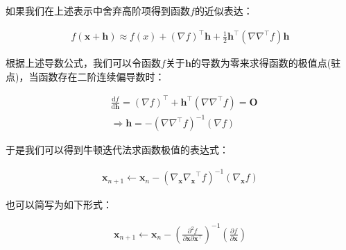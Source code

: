 \documentclass[UTF8]{book}
\begin{document}
如果我们在上述表示中舍弃高阶项得到函数$f$的近似表达：
\begin{large}
    \begin{equation}
        \begin{aligned}
            f(\mathbf{x}+\mathbf{h})\approx f(x)+(\nabla f)^\top \mathbf{h}+\frac{1}{2}\mathbf{h}^\top(\nabla \nabla^\top f)\mathbf{h}
            \nonumber
        \end{aligned}
    \end{equation}
\end{large}
根据上述导数公式，我们可以令函数$f$关于$\mathbf{h}$的导数为零来求得函数的极值点(驻点)，当函数存在二阶连续偏导数时：
\begin{large}
    \begin{equation}
        \begin{aligned}
            &\frac{\mathrm{d}f}{\mathrm{d}\mathbf{h}}=(\nabla f)^\top+\mathbf{h}^\top(\nabla \nabla^\top f)=\mathbf{O} \\
            &\Rightarrow \mathbf{h}=-(\nabla \nabla^\top f)^{-1}(\nabla f)
            \nonumber
        \end{aligned}
    \end{equation}
\end{large}
于是我们可以得到牛顿迭代法求函数极值的表达式：
\begin{large}
    \begin{equation}
        \begin{aligned}
            \mathbf{x}_{n+1} \gets \mathbf{x}_n-({\nabla_{\mathbf{x}} \nabla_{\mathbf{x}}}^\top f)^{-1}(\nabla_{\mathbf{x}} f)
            \nonumber
        \end{aligned}
    \end{equation}
\end{large}
也可以简写为如下形式：
\begin{large}
    \begin{equation}
        \begin{aligned}
            \mathbf{x}_{n+1} \gets \mathbf{x}_n-\left ( \frac{\partial^2 f}{\partial \mathbf{x}\partial \mathbf{x}^\top}\right )^{-1}\left (\frac{\partial f}{\partial \mathbf{x}}\right )
            \nonumber
        \end{aligned}
    \end{equation}
\end{large}
        
\end{document}
